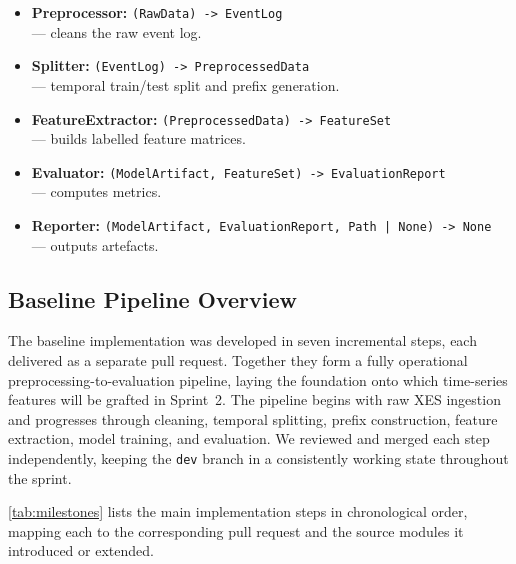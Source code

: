 \documentclass[runningheads]{llncs}
\begin{document}
\begin{itemize}
    \item \textbf{Preprocessor:} \texttt{(RawData) -> EventLog} \\
          — cleans the raw event log.
    \item \textbf{Splitter:} \texttt{(EventLog) -> PreprocessedData} \\
          — temporal train/test split and prefix generation.
    \item \textbf{FeatureExtractor:} \texttt{(PreprocessedData) -> FeatureSet} \\
          — builds labelled feature matrices.
    \item \textbf{Evaluator:} \texttt{(ModelArtifact, FeatureSet) -> EvaluationReport} \\
          — computes metrics.
    \item \textbf{Reporter:} \texttt{(ModelArtifact, EvaluationReport, Path | None) -> None} \\
          — outputs artefacts.
\end{itemize}

\subsection{Baseline Pipeline Overview}

The baseline implementation was developed in seven incremental steps, each delivered as a separate pull request. Together they form a fully operational
preprocessing-to-evaluation pipeline, laying the foundation onto which time-series features will be grafted in Sprint~2. The pipeline begins with raw XES ingestion and progresses through cleaning, temporal splitting, prefix construction, feature extraction, model training, and evaluation. We reviewed and merged each step independently, keeping the \texttt{dev} branch in a consistently working state throughout the sprint.

\autoref{tab:milestones} lists the main implementation steps in chronological order,
mapping each to the corresponding pull request and the source modules it introduced
or extended.
\end{document}
